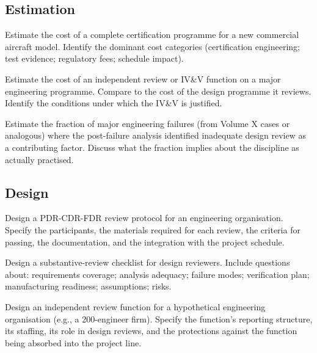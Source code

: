 \subsection*{Estimation}

\begin{exercise}
Estimate the cost of a complete certification programme for a new commercial aircraft model. Identify the dominant cost categories (certification engineering; test evidence; regulatory fees; schedule impact).
\end{exercise}

\begin{exercise}
Estimate the cost of an independent review or IV\&V function on a major engineering programme. Compare to the cost of the design programme it reviews. Identify the conditions under which the IV\&V is justified.
\end{exercise}

\begin{exercise}
Estimate the fraction of major engineering failures (from Volume X cases or analogous) where the post-failure analysis identified inadequate design review as a contributing factor. Discuss what the fraction implies about the discipline as actually practised.
\end{exercise}

\subsection*{Design}

\begin{exercise}
Design a PDR-CDR-FDR review protocol for an engineering organisation. Specify the participants, the materials required for each review, the criteria for passing, the documentation, and the integration with the project schedule.
\end{exercise}

\begin{exercise}
Design a substantive-review checklist for design reviewers. Include questions about: requirements coverage; analysis adequacy; failure modes; verification plan; manufacturing readiness; assumptions; risks.
\end{exercise}

\begin{exercise}
Design an independent review function for a hypothetical engineering organisation (e.g., a 200-engineer firm). Specify the function's reporting structure, its staffing, its role in design reviews, and the protections against the function being absorbed into the project line.
\end{exercise}

